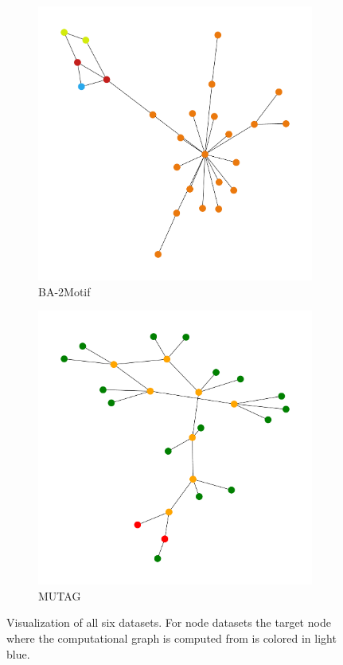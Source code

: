 \begin{figure}[H]
    \vspace{0.5cm}
    
    \begin{subfigure}[b]{0.4\textwidth}
        \includegraphics[width=\textwidth]{img/BA-2Motif-VIS-UNLABELED.pdf}
        \caption{BA-2Motif}
    \end{subfigure}
    \hfill
    \begin{subfigure}[b]{0.4\textwidth}
        \includegraphics[width=\textwidth]{img/MUTAG-VIS-LARGE-UNLABELED.pdf}
        \caption{MUTAG}
    \end{subfigure}

    \caption[Visualization of original PGExplainer datasets]{Visualization of all six datasets. For node datasets the target node where the computational graph is computed from is colored in light blue.}
\end{figure}